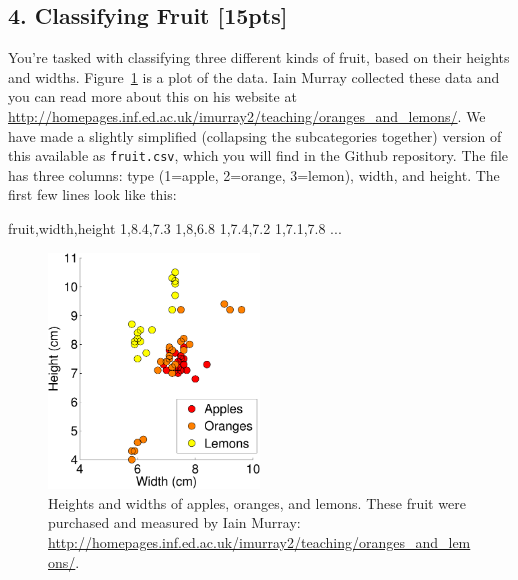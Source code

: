 \documentclass[submit]{harvardml}
\begin{document}
\newpage
\subsection*{4. Classifying Fruit [15pts]}
You're tasked with  classifying three different kinds of fruit, based on their
heights and widths.  Figure~\ref{fig:fruit} is a plot of the data.  Iain Murray
collected these data and you can read more about this on his website at
\url{http://homepages.inf.ed.ac.uk/imurray2/teaching/oranges_and_lemons/}.  We
have made a slightly simplified (collapsing the subcategories together) version
of this available as \verb|fruit.csv|, which you will find in the Github repository.
The file has three columns: type (1=apple, 2=orange, 3=lemon), width,
and height.  The first few lines look like this:
\begin{csv}
fruit,width,height
1,8.4,7.3
1,8,6.8
1,7.4,7.2
1,7.1,7.8
...
\end{csv}
\begin{figure}[h]
\centering
\includegraphics[width=0.5\textwidth]{fruit}
\caption{Heights and widths of apples, oranges, and lemons.  These fruit were
purchased and measured by Iain Murray:
\url{http://homepages.inf.ed.ac.uk/imurray2/teaching/oranges_and_lemons/}.}
\label{fig:fruit}
\end{figure}
\end{document}
